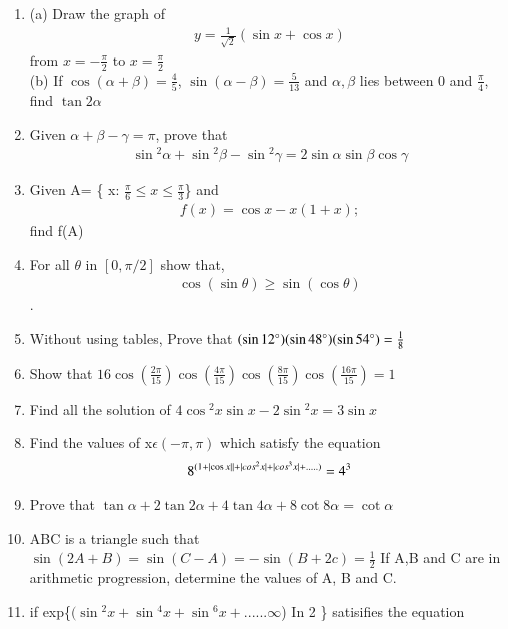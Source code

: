 \begin{enumerate}[label=\arabic*.,ref=\thesubsection.\theenumi]
    \item (a) Draw the graph of 
    \begin{align}
    y= \frac{1}{\sqrt2}(\sin{x} +\cos{x})
    \end{align} 
    from $x=-\frac{\pi}{2}$ to $x=\frac{\pi}{2}$\\
    (b)  If $\cos{(\alpha+\beta)} = \frac{4}{5}$, $\sin{(\alpha-\beta)} = \frac{5}{13}$ and $\alpha,\beta$ lies between 0 and $\frac{\pi}{4}$, find $\tan{2\alpha}$
    \item Given $\alpha+\beta-\gamma =\pi$, prove that 
    \begin{align}
    \sin{^2\alpha}+\sin{^2\beta}-\sin{^2\gamma} = 2\sin{\alpha}\sin{\beta} \cos\gamma
    \end{align}
    \item Given A= \{ x: $\frac{\pi}{6} \leq x\leq \frac{\pi}{3}$\} and \begin{align}
        f(x) = \cos{x} - x(1+x);
    \end{align}
    find f(A)
    \item  For all $\theta$ in $[0,\pi/2]$ show that, 
    \begin{align}
    \cos{(\sin{\theta})} \geq \sin{(\cos{\theta})}
    \end{align}.
    \item Without using tables, Prove that $(\sin{12\degree})(\sin{48\degree})(\sin{54\degree}) = \frac{1}{8}$
    \item Show that $16 \cos{(\frac{2\pi}{15})}\cos{(\frac{4\pi}{15})}\cos{(\frac{8\pi}{15})}\cos{(\frac{16\pi}{15})} = 1$
    \item Find all the solution of $4\cos{^2x}\sin{x} -2\sin{^2x} = 3\sin{x}$
    \item Find the values of x$\epsilon(-\pi,\pi)$ which satisfy the equation 
    \begin{align}
        8^{(1+\left\vert\cos{x \vert}\right\vert + \vert cos^2x \vert +\vert cos^3x \vert+ .....)} = 4^3
    \end{align}
    \item Prove that $\tan{\alpha} + 2 \tan{2\alpha} + 4
    \tan{4\alpha} + 8\cot{8\alpha} = \cot{\alpha}$
    \item ABC is a triangle such that 
    $\sin{(2A+B)} = \sin{(C-A)} = -\sin{(B+2c)} = \frac{1}{2}$ If A,B and C are in arithmetic progression, determine the values of A, B and C.
    \item if exp\{$(\sin{^2x} + \sin{^4x}+ \sin{^6x}+ ......\infty$) In 2 \} satisifies the equation 
    \begin{align}

\end{align}
\end{enumerate}
